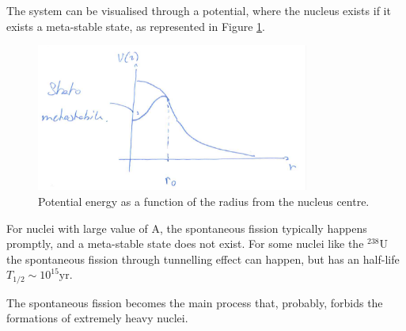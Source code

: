 The system can be visualised through a potential, where the nucleus exists if it exists a meta-stable state, as represented in Figure \ref{fig:nuclear-physics3-fig2}.
\begin{figure}
    \centering
    \includegraphics[width=0.8\textwidth]{Figures/nuclear-physics3-fig2}
    \caption{Potential energy as a function of the radius from the nucleus centre.}
    \label{fig:nuclear-physics3-fig2}
\end{figure}
For nuclei with large value of A, the spontaneous fission typically happens promptly, and a meta-stable state does not exist. For some nuclei like the $^{238}\mbox{U}$ the spontaneous fission through tunnelling effect can happen, but has an half-life $T_{1/2} \sim 10^{15} \mbox{yr}$.

The spontaneous fission becomes the main process that, probably, forbids the formations of extremely heavy nuclei. 

